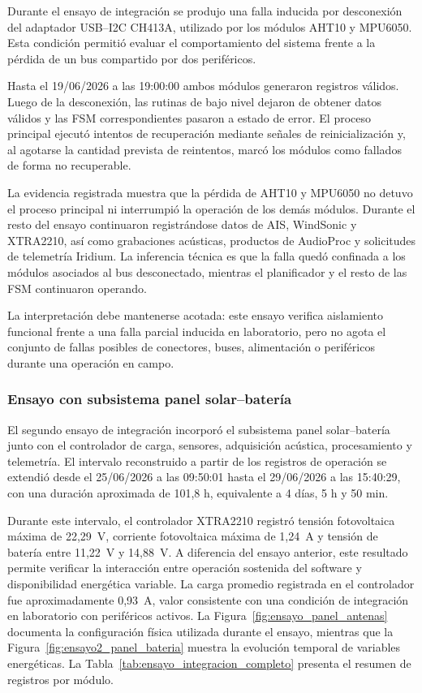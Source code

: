 Durante el ensayo de integración se produjo una falla inducida por desconexión del adaptador USB--I2C CH413A, utilizado por los módulos AHT10 y MPU6050. Esta condición permitió evaluar el comportamiento del sistema frente a la pérdida de un bus compartido por dos periféricos.

Hasta el 19/06/2026 a las 19:00:00 ambos módulos generaron registros válidos. Luego de la desconexión, las rutinas de bajo nivel dejaron de obtener datos válidos y las FSM correspondientes pasaron a estado de error. El proceso principal ejecutó intentos de recuperación mediante señales de reinicialización y, al agotarse la cantidad prevista de reintentos, marcó los módulos como fallados de forma no recuperable.

La evidencia registrada muestra que la pérdida de AHT10 y MPU6050 no detuvo el proceso principal ni interrumpió la operación de los demás módulos. Durante el resto del ensayo continuaron registrándose datos de AIS, WindSonic y XTRA2210, así como grabaciones acústicas, productos de AudioProc y solicitudes de telemetría Iridium. La inferencia técnica es que la falla quedó confinada a los módulos asociados al bus desconectado, mientras el planificador y el resto de las FSM continuaron operando.

La interpretación debe mantenerse acotada: este ensayo verifica aislamiento funcional frente a una falla parcial inducida en laboratorio, pero no agota el conjunto de fallas posibles de conectores, buses, alimentación o periféricos durante una operación en campo.

\subsubsection{Ensayo con subsistema panel solar--batería}

El segundo ensayo de integración incorporó el subsistema panel solar--batería junto con el controlador de carga, sensores, adquisición acústica, procesamiento y telemetría. El intervalo reconstruido a partir de los registros de operación se extendió desde el 25/06/2026 a las 09:50:01 hasta el 29/06/2026 a las 15:40:29, con una duración aproximada de 101,8 h, equivalente a 4 días, 5 h y 50 min.

Durante este intervalo, el controlador XTRA2210 registró tensión fotovoltaica máxima de 22,29~V, corriente fotovoltaica máxima de 1,24~A y tensión de batería entre 11,22~V y 14,88~V. A diferencia del ensayo anterior, este resultado permite verificar la interacción entre operación sostenida del software y disponibilidad energética variable. La carga promedio registrada en el controlador fue aproximadamente 0,93~A, valor consistente con una condición de integración en laboratorio con periféricos activos. La Figura~\ref{fig:ensayo_panel_antenas} documenta la configuración física utilizada durante el ensayo, mientras que la Figura~\ref{fig:ensayo2_panel_bateria} muestra la evolución temporal de variables energéticas. La Tabla~\ref{tab:ensayo_integracion_completo} presenta el resumen de registros por módulo.


